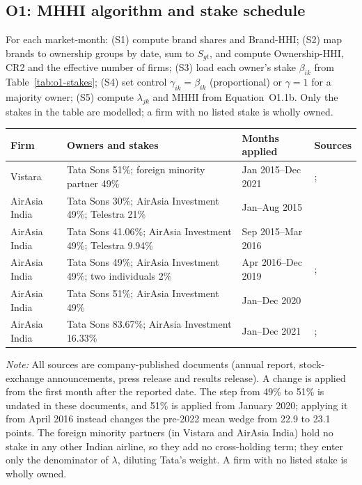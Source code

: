 \documentclass[12pt,a4paper]{article}
\newif\ifoneon
\newcommand{\oneHL}{\par\oneontrue\color{orange}\captionsetup{font+={color=blue}}}
\begin{document}
\clearpage
{\oneHL \subsection{O1: MHHI algorithm and stake schedule}
\label{app:o1-stakes}
For each market-month: (S1) compute brand shares and Brand-HHI; (S2) map brands to ownership groups by date, sum to $S_{gt}$, and compute Ownership-HHI, CR2 and the effective number of firms; (S3) load each owner's stake $\beta_{ik}$ from Table~\ref{tab:o1-stakes}; (S4) set control $\gamma_{ik}=\beta_{ik}$ (proportional) or $\gamma=1$ for a majority owner; (S5) compute $\lambda_{jk}$ and MHHI from Equation~O1.1b. Only the stakes in the table are modelled; a firm with no listed stake is wholly owned.

\begin{minipage}{\linewidth}
\label{tab:o1-stakes}
\centering
{\footnotesize{}\setlength{\tabcolsep}{4pt}
\begin{tabular}{@{}p{2.1cm}p{4.9cm}p{2.6cm}p{5.4cm}@{}}
\toprule
Firm & Owners and stakes & Months applied & Sources \\
\midrule
Vistara & Tata Sons 51\%; foreign minority partner 49\% & Jan 2015--Dec 2021 & \textcite{sia2015annual}; \textcite{sia2022merger} \\
AirAsia India & Tata Sons 30\%; AirAsia Investment 49\%; Telestra 21\% & Jan--Aug 2015 & \textcite{airasia2013jv} \\
AirAsia India & Tata Sons 41.06\%; AirAsia Investment 49\%; Telestra 9.94\% & Sep 2015--Mar 2016 & \textcite{tata2016airasia} \\
AirAsia India & Tata Sons 49\%; AirAsia Investment 49\%; two individuals 2\% & Apr 2016--Dec 2019 & \textcite{tata2016airasia}; \textcite{airasia2018q4} \\
AirAsia India & Tata Sons 51\%; AirAsia Investment 49\% & Jan--Dec 2020 & \textcite{airasia2021disposal} \\
AirAsia India & Tata Sons 83.67\%; AirAsia Investment 16.33\% & Jan--Dec 2021 & \textcite{airasia2021disposal}; \textcite{airasia2021results} \\
\bottomrule
\end{tabular}\par}
\vspace{4pt}
{\footnotesize{}\raggedright\textit{Note:} All sources are company-published documents (annual report, stock-exchange announcements, press release and results release). A change is applied from the first month after the reported date. The step from 49\% to 51\% is undated in these documents, and 51\% is applied from January 2020; applying it from April 2016 instead changes the pre-2022 mean wedge from 22.9 to 23.1 points. The foreign minority partners (in Vistara and AirAsia India) hold no stake in any other Indian airline, so they add no cross-holding term; they enter only the denominator of $\lambda$, diluting Tata's weight. A firm with no listed stake is wholly owned.\par}

\end{minipage}}
\end{document}
